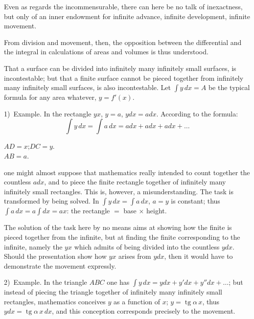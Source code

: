 \documentclass[12pt]{book}
\begin{document}
Even as regards the incommensurable, there can here be no talk of
inexactness, but only of an inner endowment for infinite advance,
infinite development, infinite movement.

From division and movement, then, the opposition between the
differential and the integral in calculations of areas and volumes is thus
understood.

That a surface can be divided into infinitely many infinitely small surfaces, is
incontestable; but that a finite surface cannot be pieced together from
infinitely many infinitely small surfaces, is also incontestable.
Let $\int y\,dx = A$ be the typical formula for any area whatever,
$y = f'(x)$.

1)~Example. In the rectangle $yx$, $y = a$, $ydx = adx$. According to the
formula:
\[
\int y\,dx = \int a\,dx = adx + adx + adx + \dots
\]
\begin{center}

$AD = x$;\quad $DC = y$. \\
$AB = a$.
\end{center}

one might almost suppose that mathematics really intended to
count together the countless $adx$, and to piece the finite rectangle together
of infinitely many infinitely small rectangles. This is, however, a
misunderstanding. The task is transformed by being solved. In
$\int y\,dx = \int a\,dx$, $a = y$ is constant; thus
$\int a\,dx = a\int dx = ax$: the rectangle $=$ base $\times$ height.

The solution of the task here by no means aims at showing how
the finite is pieced together from the infinite, but at finding the finite
corresponding to the infinite, namely the $yx$ which admits of being divided into
the countless $ydx$. Should the presentation show how $yx$
arises from $ydx$, then it would have to demonstrate the movement expressly.

2)~Example. In the triangle $ABC$ one has
$\int y\,dx = ydx + y'dx + y''dx + \dots$; but instead of
piecing the triangle together of infinitely many infinitely small rectangles,
mathematics conceives $y$ as a function of $x$;
$y = \operatorname{tg}\alpha\,x$, thus
$ydx = \operatorname{tg}\alpha\,x\,dx$, and this conception corresponds precisely to
the movement.
\end{document}
